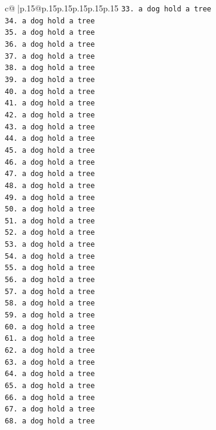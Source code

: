 \documentclass{article}
\begin{document}
{\begin{supertabular}{c@{$\;$}|p{.15\linewidth}@{}p{.15\linewidth}p{.15\linewidth}p{.15\linewidth}p{.15\linewidth}p{.15\linewidth}}
{{{\texttt{33. a dog hold a tree} \\
\texttt{34. a dog hold a tree} \\
\texttt{35. a dog hold a tree} \\
\texttt{36. a dog hold a tree} \\
\texttt{37. a dog hold a tree} \\
\texttt{38. a dog hold a tree} \\
\texttt{39. a dog hold a tree} \\
\texttt{40. a dog hold a tree} \\
\texttt{41. a dog hold a tree} \\
\texttt{42. a dog hold a tree} \\
\texttt{43. a dog hold a tree} \\
\texttt{44. a dog hold a tree} \\
\texttt{45. a dog hold a tree} \\
\texttt{46. a dog hold a tree} \\
\texttt{47. a dog hold a tree} \\
\texttt{48. a dog hold a tree} \\
\texttt{49. a dog hold a tree} \\
\texttt{50. a dog hold a tree} \\
\texttt{51. a dog hold a tree} \\
\texttt{52. a dog hold a tree} \\
\texttt{53. a dog hold a tree} \\
\texttt{54. a dog hold a tree} \\
\texttt{55. a dog hold a tree} \\
\texttt{56. a dog hold a tree} \\
\texttt{57. a dog hold a tree} \\
\texttt{58. a dog hold a tree} \\
\texttt{59. a dog hold a tree} \\
\texttt{60. a dog hold a tree} \\
\texttt{61. a dog hold a tree} \\
\texttt{62. a dog hold a tree} \\
\texttt{63. a dog hold a tree} \\
\texttt{64. a dog hold a tree} \\
\texttt{65. a dog hold a tree} \\
\texttt{66. a dog hold a tree} \\
\texttt{67. a dog hold a tree} \\
\texttt{68. a dog hold a tree} \\
}}}
\end{supertabular}}
\end{document}
